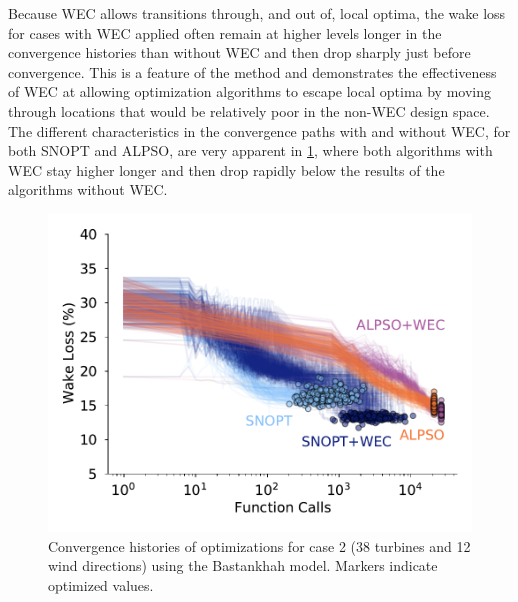 \documentclass{jpconf}
\begin{document}
Because WEC allows transitions through, and out of, local optima, the wake loss for cases with WEC applied often remain at higher levels longer in the convergence histories than without WEC and then drop sharply just before convergence. This is a feature of the method and demonstrates the effectiveness of WEC at allowing optimization algorithms to escape local optima by moving through locations that would be relatively poor in the non-WEC design space. The different characteristics in the convergence paths with and without WEC, for both SNOPT and ALPSO, are very apparent in \cref{fig:case-2-histories}, where both algorithms with WEC stay higher longer and then drop rapidly below the results of the algorithms without WEC.

\begin{figure}[h!]
	\centering
	\begin{minipage}[t]{.45\textwidth}
		\centering
		\includegraphics[width=\textwidth]{final_images/results/convergence_history_BPAmodel_38turbs_12dirs}  
		\caption{Convergence histories of optimizations for case 2 (38 turbines and 12 wind directions) using the Bastankhah model. Markers indicate optimized values.}
		\label{fig:case-2-histories}
	\end{minipage}\hspace{1pc}
	\begin{minipage}[t]{0.45\textwidth}
		\centering

\end{minipage}
\end{figure}
\end{document}
